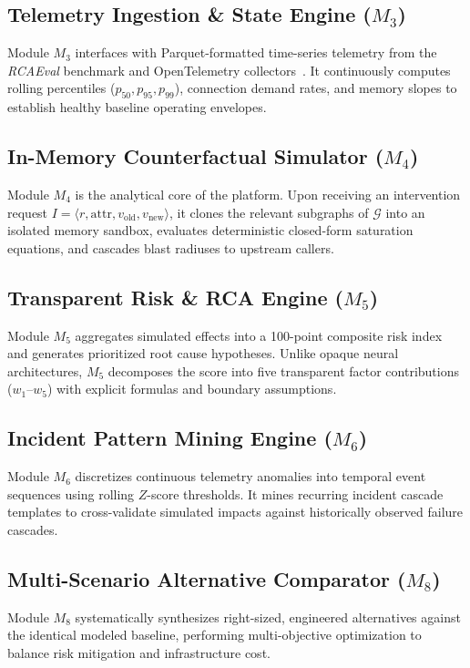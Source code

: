 \documentclass[conference]{IEEEtran}
\begin{document}
\subsection{Telemetry Ingestion \& State Engine ($M_3$)}
Module $M_3$ interfaces with Parquet-formatted time-series telemetry from the \textit{RCAEval} benchmark and OpenTelemetry collectors~\cite{opentelemetry2023spec,phamquiluan2024rcaeval}. It continuously computes rolling percentiles ($p_{50}, p_{95}, p_{99}$), connection demand rates, and memory slopes to establish healthy baseline operating envelopes.

\subsection{In-Memory Counterfactual Simulator ($M_4$)}
Module $M_4$ is the analytical core of the platform. Upon receiving an intervention request $I = \langle r, \text{attr}, v_{\text{old}}, v_{\text{new}} \rangle$, it clones the relevant subgraphs of $\mathcal{G}$ into an isolated memory sandbox, evaluates deterministic closed-form saturation equations, and cascades blast radiuses to upstream callers.

\subsection{Transparent Risk \& RCA Engine ($M_5$)}
Module $M_5$ aggregates simulated effects into a 100-point composite risk index and generates prioritized root cause hypotheses. Unlike opaque neural architectures, $M_5$ decomposes the score into five transparent factor contributions ($w_1$--$w_5$) with explicit formulas and boundary assumptions.

\subsection{Incident Pattern Mining Engine ($M_6$)}
Module $M_6$ discretizes continuous telemetry anomalies into temporal event sequences using rolling $Z$-score thresholds. It mines recurring incident cascade templates to cross-validate simulated impacts against historically observed failure cascades.

\subsection{Multi-Scenario Alternative Comparator ($M_8$)}
Module $M_8$ systematically synthesizes right-sized, engineered alternatives against the identical modeled baseline, performing multi-objective optimization to balance risk mitigation and infrastructure cost.
\end{document}
